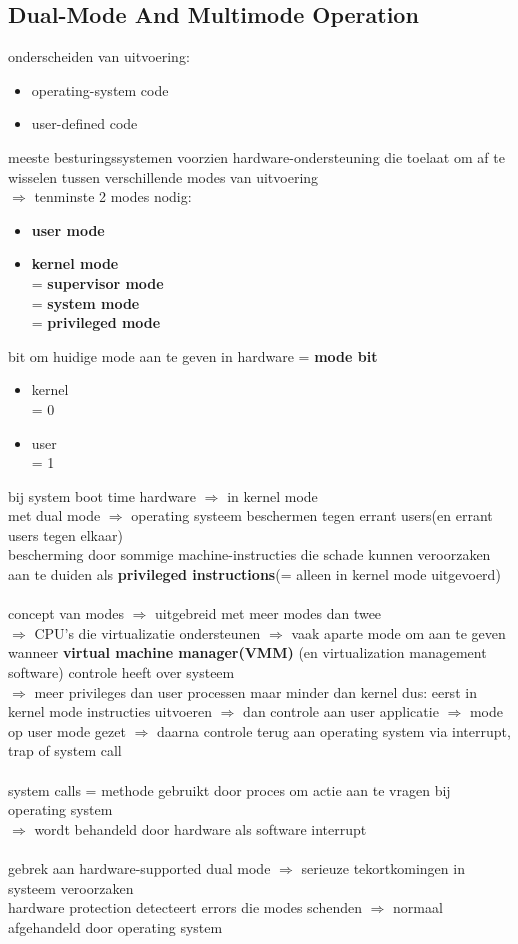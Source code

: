 \documentclass{report}
\begin{document}
\subsection{Dual-Mode And Multimode Operation}
onderscheiden van uitvoering:
\begin{itemize}
\item operating-system code
\item user-defined code
\end{itemize}
meeste besturingssystemen voorzien hardware-ondersteuning die toelaat om af te wisselen tussen verschillende modes van uitvoering
\\$\Rightarrow$ tenminste 2 modes nodig:
\begin{itemize}
\item \textbf{user mode}
\item \textbf{kernel mode}
\\= \textbf{supervisor mode}
\\= \textbf{system mode}
\\= \textbf{privileged mode}
\end{itemize}
bit om huidige mode aan te geven in hardware = \textbf{mode bit}
\begin{itemize}
\item kernel
\\ = 0
\item user
\\ = 1
\end{itemize}
bij system boot time hardware $\Rightarrow$ in kernel mode
\\met dual mode $\Rightarrow$ operating systeem beschermen tegen errant users(en errant users tegen elkaar)
\\bescherming door sommige machine-instructies die schade kunnen veroorzaken aan te duiden als \textbf{privileged instructions}(= alleen in kernel mode uitgevoerd)
\\
\\concept van modes $\Rightarrow$ uitgebreid met meer modes dan twee
\\$\Rightarrow$ CPU's die virtualizatie ondersteunen $\Rightarrow$ vaak aparte mode om aan te geven wanneer \textbf{virtual machine manager(VMM)} (en virtualization management software) controle heeft over systeem
\\$\Rightarrow$ meer privileges dan user processen maar minder dan kernel
dus: eerst in kernel mode instructies uitvoeren $\Rightarrow$ dan controle aan user applicatie $\Rightarrow$ mode op user mode gezet $\Rightarrow$ daarna controle terug aan operating system via interrupt, trap of system call
\\
\\system calls = methode gebruikt door proces om actie aan te vragen bij operating system
\\$\Rightarrow$ wordt behandeld door hardware als software interrupt
\\
\\gebrek aan hardware-supported dual mode $\Rightarrow$ serieuze tekortkomingen in systeem veroorzaken
\\hardware protection detecteert errors die modes schenden $\Rightarrow$ normaal afgehandeld door operating system
\end{document}
